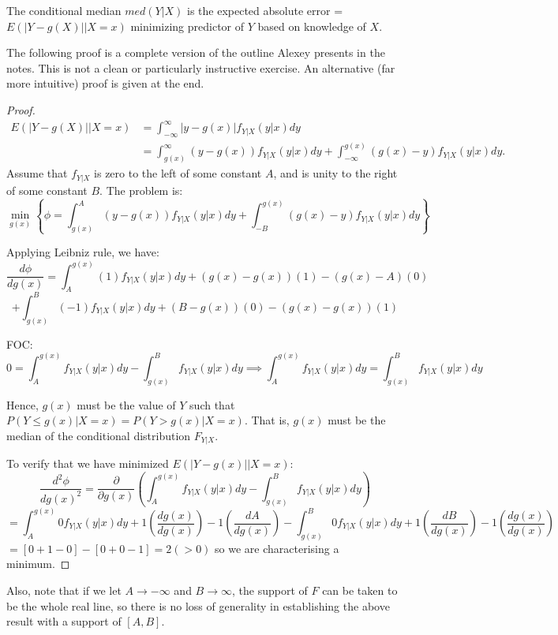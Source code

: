 \documentclass[DIV=14,titlepage=false]{scrreprt}
\begin{document}
\begin{theorem}
  The conditional median $med(Y|X)$ is the expected absolute error = $E(|Y - g(X)||X = x)$ minimizing predictor of $ Y $ based on knowledge of $ X $.
\end{theorem}
The following proof is a complete version of the outline Alexey presents in the notes. This is not a clean or particularly instructive exercise. An alternative (far more intuitive) proof is given at the end.\\
\begin{proof}
\begin{align*}
  E(|Y - g(X)||X = x) &= \int_{-\infty}^{\infty} |y - g(x)| f_{Y|X}(y|x) dy\\
  &= \int_{g(x)}^{\infty} (y - g(x)) f_{Y|X}(y|x) dy + \int_{-\infty}^{g(x)} (g(x) - y) f_{Y|X}(y|x) dy.
\end{align*}
Assume that \( f_{Y|X} \) is zero to the left of some constant \( A \), and is unity to the right of some constant \( B \). The problem is: 
\[ \min_{g(x)} \left\{ \phi = \int_{g(x)}^{A} (y - g(x)) f_{Y|X}(y|x) dy + \int_{-B}^{g(x)} (g(x) - y) f_{Y|X}(y|x) dy \right\} \]

Applying Leibniz rule, we have:
\[
\frac{d\phi}{dg(x)} = \int_{A}^{g(x)} (1) f_{Y|X}(y|x) dy + (g(x) - g(x))(1) - (g(x)-A)(0)\]
\[+ \int_{g(x)}^{B} (-1)f_{Y|X}(y|x) dy + (B-g(x))(0) - (g(x)-g(x))(1)
\]

FOC: 
\[
0 =  \int_{A}^{g(x)}f_{Y|X}(y|x) dy -\int_{g(x)}^{B}f_{Y|X}(y|x) dy \implies \int_{A}^{g(x)}f_{Y|X}(y|x) dy = \int_{g(x)}^{B}f_{Y|X}(y|x) dy
\]

Hence, \( g(x) \) must be the value of \( Y \) such that \( P(Y \leq g(x)|X = x) = P(Y > g(x)|X = x) \). That is, \( g(x) \) must be the median of the conditional distribution \( F_{Y|X} \).

To verify that we have minimized \( E(|Y - g(x)||X = x) \):
\[
\frac{d^2\phi}{dg(x)^2} = \frac{\partial}{\partial g(x)} \left( \int_{A}^{g(x)}f_{Y|X}(y|x) dy -\int_{g(x)}^{B}f_{Y|X}(y|x) dy \right)
\]
\[
= \int_{A}^{g(x)} 0f_{Y|X}(y|x) dy + 1\left(\frac{dg(x)}{dg(x)}\right) - 1\left(\frac{dA}{dg(x)}\right)  - \int_{g(x)}^{B} 0f_{Y|X}(y|x) dy + 1\left(\frac{dB}{dg(x)}\right) - 1\left(\frac{dg(x)}{dg(x)}\right)
\]
$=[0+1-0]-[0+0-1]=2(>0)$ so we are characterising a minimum.
\end{proof}
Also, note that if we let \( A \to -\infty \) and \( B \to \infty \), the support of \( F \) can be taken to be the whole real line, so there is no loss of generality in establishing the above result with a support of \( [A, B] \).\\
\end{document}
